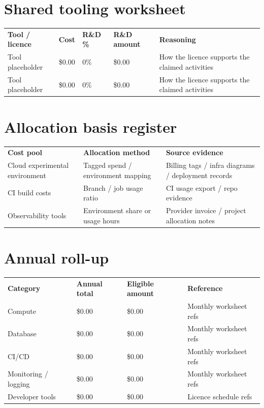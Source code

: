 \documentclass[11pt]{article}
\begin{document}
\section{Shared tooling worksheet}
\begin{xltabular}{\textwidth}{L{3.6cm}L{1.8cm}L{1.8cm}L{1.9cm}Y}
\textbf{Tool / licence} & \textbf{Cost} & \textbf{R\&D \%} & \textbf{R\&D amount} & \textbf{Reasoning} \\
{Tool placeholder} & {\$0.00} & {0\%} & {\$0.00} & {How the licence supports the claimed activities} \\
{Tool placeholder} & {\$0.00} & {0\%} & {\$0.00} & {How the licence supports the claimed activities} \\
\end{xltabular}

\section{Allocation basis register}
\begin{xltabular}{\textwidth}{L{3.4cm}L{3.2cm}Y}
\textbf{Cost pool} & \textbf{Allocation method} & \textbf{Source evidence} \\
{Cloud experimental environment} & {Tagged spend / environment mapping} & {Billing tags / infra diagrams / deployment records} \\
{CI build costs} & {Branch / job usage ratio} & {CI usage export / repo evidence} \\
{Observability tools} & {Environment share or usage hours} & {Provider invoice / project allocation notes} \\
\end{xltabular}

\section{Annual roll-up}
\begin{xltabular}{\textwidth}{L{4.0cm}L{2.0cm}L{2.0cm}Y}
\textbf{Category} & \textbf{Annual total} & \textbf{Eligible amount} & \textbf{Reference} \\
{Compute} & {\$0.00} & {\$0.00} & {Monthly worksheet refs} \\
{Database} & {\$0.00} & {\$0.00} & {Monthly worksheet refs} \\
{CI/CD} & {\$0.00} & {\$0.00} & {Monthly worksheet refs} \\
{Monitoring / logging} & {\$0.00} & {\$0.00} & {Monthly worksheet refs} \\
{Developer tools} & {\$0.00} & {\$0.00} & {Licence schedule refs} \\
\end{xltabular}
\end{document}

